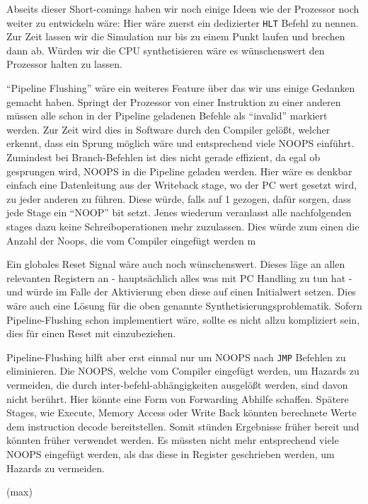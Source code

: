 \documentclass[paper=a4,fontsize=12pt,twocolumn]{scrreprt}
\begin{document}
Abseits dieser Short-comings haben wir noch einige Ideen wie der Prozessor noch weiter zu entwickeln wäre:
Hier wäre zuerst ein dedizierter \texttt{HLT} Befehl zu nennen.
Zur Zeit lassen wir die Simulation nur bis zu einem Punkt laufen und brechen dann ab.
Würden wir die CPU synthetisieren wäre es wünschenswert den Prozessor halten zu lassen.

\enquote{Pipeline Flushing} wäre ein weiteres Feature über das wir uns einige Gedanken gemacht haben.
Springt der Prozessor von einer Instruktion zu einer anderen müssen alle schon in der Pipeline geladenen Befehle als \enquote{invalid} markiert werden.
Zur Zeit wird dies in Software durch den Compiler gelößt, welcher erkennt, dass ein Sprung möglich wäre und entsprechend viele NOOPS einführt.
Zumindest bei Branch-Befehlen ist dies nicht gerade effizient, da egal ob gesprungen wird, NOOPS in die Pipeline geladen werden.
Hier wäre es denkbar einfach eine Datenleitung aus der Writeback stage, wo der PC wert gesetzt wird, zu jeder anderen zu führen.
Diese würde, falls auf 1 gezogen, dafür sorgen, dass jede Stage ein \enquote{NOOP} bit setzt.
Jenes wiederum veranlasst alle nachfolgenden stages dazu keine Schreiboperationen mehr zuzulassen.
Dies würde zum einen die Anzahl der Noops, die vom Compiler eingefügt werden m

Ein globales Reset Signal wäre auch noch wünschenswert.
Dieses läge an allen relevanten Registern an - hauptsächlich alles was mit PC Handling zu tun hat - und würde im Falle der Aktivierung eben diese auf einen Initialwert setzen.
Dies wäre auch eine Lösung für die oben genannte Synthetisierungsproblematik.
Sofern Pipeline-Flushing schon implementiert wäre, sollte es nicht allzu kompliziert sein, dies für einen Reset mit einzubeziehen.

Pipeline-Flushing hilft aber erst einmal nur um NOOPS nach \texttt{JMP} Befehlen zu eliminieren.
Die NOOPS, welche vom Compiler eingefügt werden, um Hazards zu vermeiden, die durch inter-befehl-abhängigkeiten ausgelößt werden, sind davon nicht berührt.
Hier könnte eine Form von Forwarding Abhilfe schaffen.
Spätere Stages, wie Execute, Memory Access oder Write Back könnten berechnete Werte dem instruction decode bereitstellen.
Somit stünden Ergebnisse früher bereit und könnten früher verwendet werden.
Es müssten nicht mehr entsprechend viele NOOPS eingefügt werden, als das diese in Register geschrieben werden, um Hazards zu vermeiden.

(max)
\end{document}
